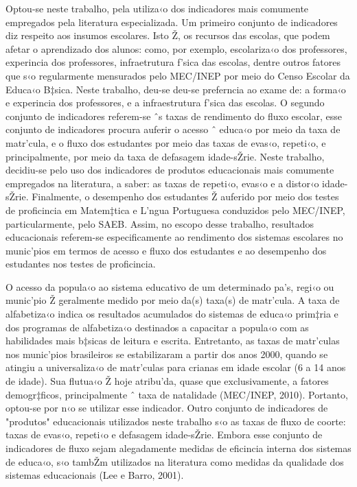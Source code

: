 \documentclass[a4paper, 12pt]{article}
\begin{document}
Optou-se neste trabalho, pela utiliza‹o dos indicadores mais comumente empregados pela literatura especializada. Um primeiro conjunto de indicadores diz respeito aos insumos escolares. Isto Ž, os recursos das escolas, que podem afetar o aprendizado dos alunos: como, por exemplo, escolariza‹o dos professores, experincia dos professores, infraetrutura f’sica das escolas, dentre outros fatores que s‹o regularmente mensurados pelo MEC/INEP por meio do Censo Escolar da Educa‹o B‡sica. Neste trabalho, deu-se deu-se preferncia ao exame de: a forma‹o e experincia dos professores, e a infraestrutura f’sica das escolas. O segundo conjunto de indicadores referem-se ˆs taxas de rendimento do fluxo escolar, esse conjunto de indicadores procura auferir o acesso ˆ educa‹o por meio da taxa de matr’cula, e o fluxo dos estudantes por meio das taxas de evas‹o, repeti‹o, e principalmente, por meio da taxa de defasagem idade-sŽrie. Neste trabalho, decidiu-se pelo uso dos indicadores de produtos educacionais mais comumente empregados na literatura, a saber: as taxas de repeti‹o, evas‹o e a distor‹o idade-sŽrie. Finalmente, o desempenho dos estudantes Ž auferido por meio dos testes de proficincia em Matem‡tica e L’ngua Portuguesa conduzidos pelo MEC/INEP, particularmente, pelo SAEB. Assim, no escopo desse trabalho, resultados educacionais referem-se especificamente ao rendimento dos sistemas escolares no munic’pios em termos de acesso e fluxo dos estudantes e ao desempenho dos estudantes nos testes de proficincia.

O acesso da popula‹o ao sistema educativo de um determinado pa’s, regi‹o ou munic’pio Ž geralmente medido por meio da(s) taxa(s) de matr’cula. A taxa de alfabetiza‹o indica os resultados acumulados do sistemas de educa‹o prim‡ria e dos programas de alfabetiza‹o destinados a capacitar a popula‹o com as habilidades mais b‡sicas de leitura e escrita. Entretanto, as taxas de matr’culas nos munic’pios brasileiros se estabilizaram a partir dos anos 2000, quando se atingiu a universaliza‹o de matr’culas para crianas em idade escolar (6 a 14 anos de idade). Sua flutua‹o Ž hoje atribu’da, quase que exclusivamente, a fatores demogr‡ficos, principalmente ˆ taxa de natalidade (MEC/INEP, 2010). Portanto, optou-se por n‹o se utilizar esse indicador. Outro conjunto de indicadores de "produtos" educacionais utilizados neste trabalho s‹o as taxas de fluxo de coorte: taxas de evas‹o, repeti‹o e defasagem idade-sŽrie. Embora esse conjunto de indicadores de fluxo sejam alegadamente medidas de eficincia interna dos sistemas de educa‹o, s‹o tambŽm utilizados na literatura como medidas da qualidade dos sistemas educacionais (Lee e Barro, 2001).
\end{document}
